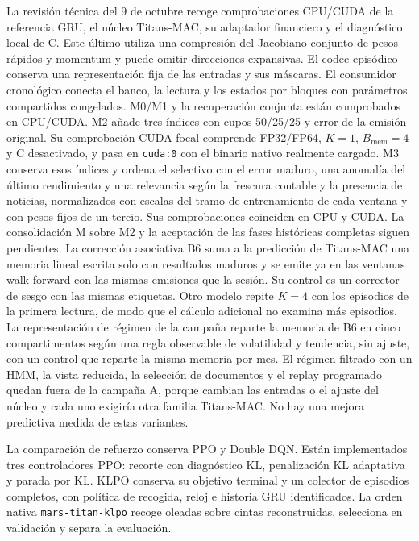 \documentclass[11pt,a4paper]{report}
\begin{document}
La revisión técnica del 9 de octubre recoge comprobaciones CPU/CUDA de la referencia GRU,
el núcleo Titans-MAC, su adaptador financiero y el diagnóstico local de C.
Este último utiliza una compresión del Jacobiano conjunto de pesos rápidos
y momentum y puede omitir direcciones expansivas. El codec episódico conserva
una representación fija de las entradas y sus máscaras. El consumidor
cronológico conecta el banco, la lectura y los estados por bloques con
parámetros compartidos congelados. M0/M1 y la recuperación conjunta están
comprobados en CPU/CUDA. M2 añade tres índices con cupos 50/25/25 y error de la
emisión original. Su comprobación CUDA focal comprende FP32/FP64, $K=1$,
$B_{\mathrm{mem}}=4$ y C desactivado, y pasa en \texttt{cuda:0} con el binario
nativo realmente cargado. M3 conserva esos índices y ordena el selectivo con
el error maduro, una anomalía del último rendimiento y una relevancia según la
frescura contable y la presencia de noticias, normalizados con escalas del
tramo de entrenamiento de cada ventana y con pesos fijos de un tercio. Sus
comprobaciones coinciden en CPU y CUDA. La consolidación M sobre M2 y la
aceptación de las fases históricas completas siguen pendientes. La corrección
asociativa B6 suma a la predicción de Titans-MAC una memoria lineal escrita
solo con resultados maduros y se emite ya en las ventanas walk-forward con las
mismas emisiones que la sesión. Su control es un corrector de sesgo con las
mismas etiquetas. Otro modelo repite $K=4$ con los episodios de la primera
lectura, de modo que el cálculo adicional no examina más episodios. La
representación de régimen de la campaña reparte la memoria de B6 en cinco
compartimentos según una regla observable de volatilidad y tendencia, sin
ajuste, con un control que reparte la misma memoria por mes. El régimen
filtrado con un HMM, la vista reducida, la selección de documentos y el replay
programado quedan fuera de la campaña A, porque cambian las entradas o el ajuste del
núcleo y cada uno exigiría otra familia Titans-MAC. No hay una mejora
predictiva medida de estas variantes.

La comparación de refuerzo conserva PPO y Double DQN. Están implementados tres
controladores PPO: recorte con diagnóstico KL, penalización KL adaptativa y
parada por KL. KLPO conserva su objetivo terminal y un colector de episodios
completos, con política de recogida, reloj e historia GRU identificados. La
orden nativa \texttt{mars-titan-klpo} recoge oleadas sobre cintas reconstruidas,
selecciona en validación y separa la evaluación.
\end{document}

